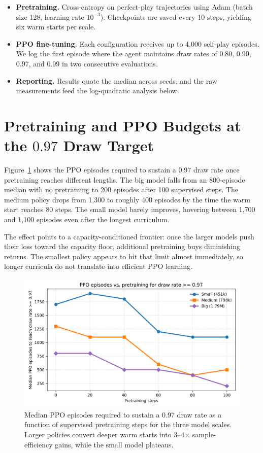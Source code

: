 \documentclass[11pt]{article}
\begin{document}
\begin{itemize}
    \item \textbf{Pretraining.} Cross-entropy on perfect-play trajectories using Adam (batch size 128, learning rate $10^{-3}$). Checkpoints are saved every 10 steps, yielding six warm starts per scale.
    \item \textbf{PPO fine-tuning.} Each configuration receives up to 4{,}000 self-play episodes. We log the first episode where the agent maintains draw rates of 0.80, 0.90, 0.97, and 0.99 in two consecutive evaluations.
    \item \textbf{Reporting.} Results quote the median across seeds, and the raw measurements feed the log-quadratic analysis below.
\end{itemize}

\section{Pretraining and PPO Budgets at the \texorpdfstring{$0.97$}{0.97} Draw Target}
Figure~\ref{fig:episodes97} shows the PPO episodes required to sustain a 0.97 draw rate once pretraining reaches different lengths. The big model falls from an 800-episode median with no pretraining to 200 episodes after 100 supervised steps. The medium policy drops from 1{,}300 to roughly 400 episodes by the time the warm start reaches 80 steps. The small model barely improves, hovering between 1{,}700 and 1{,}100 episodes even after the longest curriculum.

The effect points to a capacity-conditioned frontier: once the larger models push their loss toward the capacity floor, additional pretraining buys diminishing returns. The smallest policy appears to hit that limit almost immediately, so longer curricula do not translate into efficient PPO learning.

\begin{figure}[H]
    \centering
    \includegraphics[width=0.75\linewidth]{warm-start-episodes-0_97.png}
    \caption{Median PPO episodes required to sustain a 0.97 draw rate as a function of supervised pretraining steps for the three model scales. Larger policies convert deeper warm starts into 3--4$\times$ sample-efficiency gains, while the small model plateaus.}
    \label{fig:episodes97}
\end{figure}
\end{document}
